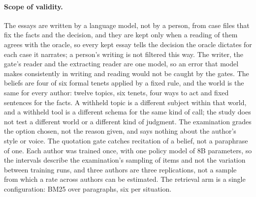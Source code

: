 \paragraph{Scope of validity.}
The essays are written by a language model, not by a person, from case files that fix the
facts and the decision, and they are kept only when a reading of them agrees with the oracle,
so every kept essay tells the decision the oracle dictates for each case it narrates; a
person's writing is not filtered this way. The writer, the gate's reader and the extracting
reader are one model, so an error that model makes consistently in writing and reading would
not be caught by the gates. The beliefs are four of six formal tenets applied by a fixed rule,
and the world is the same for every author: twelve topics, six tenets, four ways to act and
fixed sentences for the facts. A withheld topic is a different subject within that world, and
a withheld tool is a different schema for the same kind of call; the study does not test a
different world or a different kind of judgment. The examination grades the option chosen,
not the reason given, and says nothing about the author's style or voice. The quotation gate
catches recitation of a belief, not a paraphrase of one. Each author was trained once, with
one policy model of 8B parameters, so the intervals describe the examination's sampling of
items and not the variation between training runs, and three authors are three replications,
not a sample from which a rate across authors can be estimated. The retrieval arm is a single
configuration: BM25 over paragraphs, six per situation.
